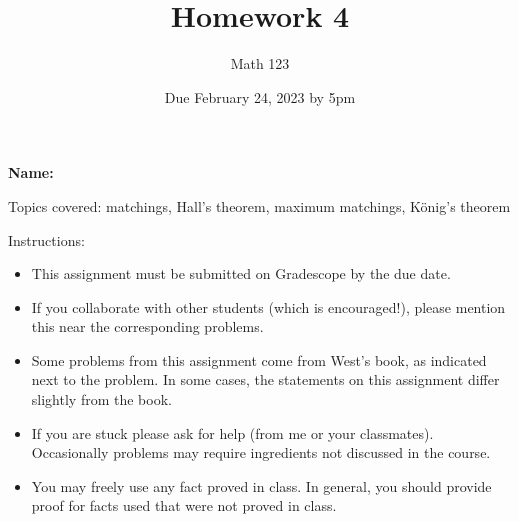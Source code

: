 \documentclass[11pt]{article}
\author{Math 123}
\date{Due February 24, 2023 by 5pm}
\title{Homework 4}
\begin{document}
\maketitle

{\bf\Large Name:} 


\vspace{.3in}
Topics covered: matchings, Hall's theorem, maximum matchings, K\"onig's theorem

Instructions: 
\begin{itemize}
\item This assignment must be submitted on Gradescope by the due date. 
\item If you collaborate with other students (which is encouraged!), please mention this near the corresponding problems. 
\item Some problems from this assignment come from West's book, as indicated next to the problem. In some cases, the statements on this assignment differ slightly from the book. 
\item If you are stuck please ask for help (from me or your classmates). Occasionally problems may require ingredients not discussed in the course. 
\item You may freely use any fact proved in class. In general, you should provide proof for facts used that were not proved in class. 
\end{itemize}

\pagebreak 
\end{document}

